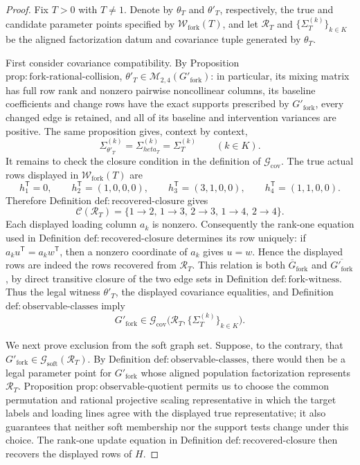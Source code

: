 \documentclass{article}
\begin{document}
\begin{proof}
Fix \(T>0\) with \(T\ne 1\).  Denote by \(\theta_T\) and \(\theta'_T\), respectively, the true and candidate parameter points specified by \(\mathcal W_{\mathrm{fork}}(T)\), and let \(\mathcal R_T\) and \(\{\Sigma_T^{(k)}\}_{k\in K}\) be the aligned factorization datum and covariance tuple generated by \(\theta_T\).

First consider covariance compatibility.  By Proposition \(\mathrm{prop{:}fork\text{-}rational\text{-}collision}\), \(\theta'_T\in\mathcal M_{2,4}(G'_{\mathrm{fork}})\): in particular, its mixing matrix has full row rank and nonzero pairwise noncollinear columns, its baseline coefficients and change rows have the exact supports prescribed by \(G'_{\mathrm{fork}}\), every changed edge is retained, and all of its baseline and intervention variances are positive.  The same proposition gives, context by context,
\[
 \Sigma_{\theta'_T}^{(k)}=\Sigma_{  heta_T}^{(k)}=\Sigma_T^{(k)}
 \qquad(k\in K).
\]
It remains to check the closure condition in the definition of \(\mathcal G_{\mathrm{cov}}\).  The true actual rows displayed in \(\mathcal W_{\mathrm{fork}}(T)\) are
\[
 h_1^{\mathsf T}=0,\qquad
 h_2^{\mathsf T}=(1,0,0,0),\qquad
 h_3^{\mathsf T}=(3,1,0,0),\qquad
 h_4^{\mathsf T}=(1,1,0,0).
\]
Therefore Definition \(\mathrm{def{:}recovered\text{-}closure}\) gives
\[
 \mathcal C(\mathcal R_T)
 =\{1\to2,\,1\to3,\,2\to3,\,1\to4,\,2\to4\}.
\]
Each displayed loading column \(a_k\) is nonzero.  Consequently the rank-one equation used in Definition \(\mathrm{def{:}recovered\text{-}closure}\) determines its row uniquely: if \(a_ku^{\mathsf T}=a_kw^{\mathsf T}\), then a nonzero coordinate of \(a_k\) gives \(u=w\).  Hence the displayed rows are indeed the rows recovered from \(\mathcal R_T\).  This relation is both \(\overline G_{\mathrm{fork}}\) and \(\overline {G'_{\mathrm{fork}}}\), by direct transitive closure of the two edge sets in Definition \(\mathrm{def{:}fork\text{-}witness}\).  Thus the legal witness \(\theta'_T\), the displayed covariance equalities, and Definition \(\mathrm{def{:}observable\text{-}classes}\) imply
\[
 G'_{\mathrm{fork}}\in
 \mathcal G_{\mathrm{cov}}
 \bigl(\mathcal R_T,\{\Sigma_T^{(k)}\}_{k\in K}\bigr).
\]

We next prove exclusion from the soft graph set.  Suppose, to the contrary, that
\(G'_{\mathrm{fork}}\in\mathcal G_{\mathrm{soft}}(\mathcal R_T)\).  By Definition \(\mathrm{def{:}observable\text{-}classes}\), there would then be a legal parameter point for \(G'_{\mathrm{fork}}\) whose aligned population factorization represents \(\mathcal R_T\).  Proposition \(\mathrm{prop{:}observable\text{-}quotient}\) permits us to choose the common permutation and rational projective scaling representative in which the target labels and loading lines agree with the displayed true representative; it also guarantees that neither soft membership nor the support tests change under this choice.  The rank-one update equation in Definition \(\mathrm{def{:}recovered\text{-}closure}\) then recovers the displayed rows of \(H\).


\end{proof}
\end{document}
